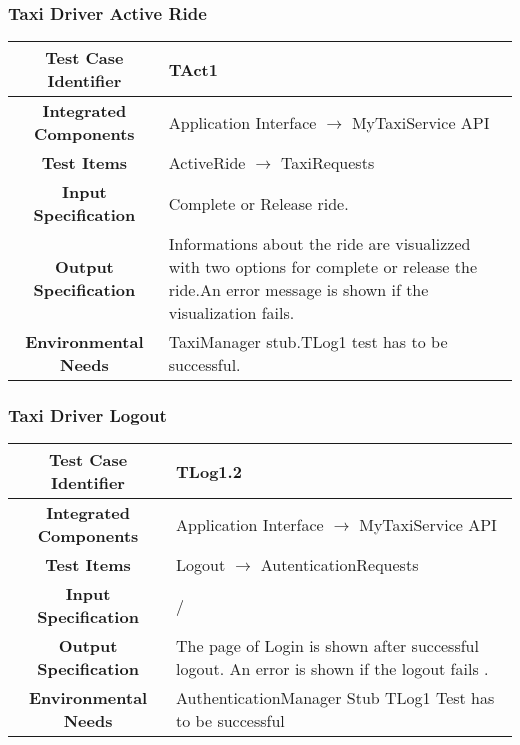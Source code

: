 \documentclass[11pt, a4paper,titlepage]{article}
\begin{document}
	\subsubsection{Taxi Driver Active Ride }
	\begin{tabularx}{\textwidth}{| c|X|}
		\hline \textbf{Test Case Identifier} & \label{TAct1}TAct1 \\
		\hline \textbf{Integrated Components} & Application Interface $\rightarrow $ MyTaxiService API \\
		\hline \textbf{Test Items} & ActiveRide $\rightarrow $ TaxiRequests \\
		\hline \textbf{Input Specification} & Complete or Release ride. \\
		\hline \textbf{Output Specification} & Informations about the ride are visualizzed with two options for complete or release the ride.\newline An error message is shown if the visualization fails. \\
		\hline \textbf{Environmental Needs} & TaxiManager stub.\newline TLog1 test has to be successful. \\
		\hline
	\end{tabularx}
	\newline
	\newline
	\subsubsection{Taxi Driver Logout}
	\begin{tabularx}{\textwidth}{| c|X|}
		\hline \textbf{Test Case Identifier} & \label{TLog1.2}TLog1.2 \\
		\hline \textbf{Integrated Components} & Application Interface $\rightarrow $ MyTaxiService API \\
		\hline \textbf{Test Items} & Logout $\rightarrow $ AutenticationRequests \\
		\hline \textbf{Input Specification} & / \\
		\hline \textbf{Output Specification} & 
		The page of Login is shown after successful logout.\newline
		An error is shown if the logout fails .\\
		\hline \textbf{Environmental Needs} & AuthenticationManager Stub \newline	TLog1 Test has to be successful \\
		\hline
	\end{tabularx}
	\newline
	\newline
\end{document}
